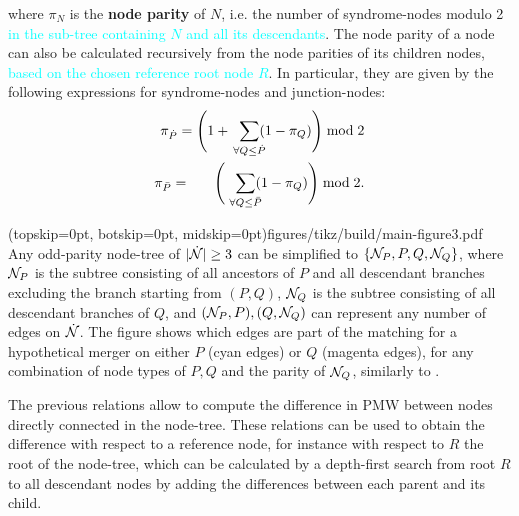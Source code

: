 where $\pi_N$ is the \textbf{node parity} of $N$, i.e. the number of syndrome-nodes modulo 2 \textcolor{cyan}{in the sub-tree containing $N$ and all its descendants}. The node parity of a node can also be calculated recursively from the node parities of its children nodes, \textcolor{cyan}{based on the chosen reference root node $R$}. In particular, they are given by the following expressions for syndrome-nodes and junction-nodes: 
\begin{align}
    \pi_{\dot{P}} = \Bigg(1 + \hspace{.2cm} \sum_{\mathclap{\forall Q \leq \dot{P}}} (1-\pi_Q) \Bigg ) \bmod 2 \label{eq:snodeparity} \\
    \pi_{\bar{P}} = \hspace{.6cm} \Bigg(\hspace{.2cm} \sum_{\mathclap{\forall Q \leq \bar{P}}} (1-\pi_Q) \Bigg) \bmod 2.  \label{eq:jnodeparity}
\end{align}

\Figure[tb](topskip=0pt, botskip=0pt, midskip=0pt){figures/tikz/build/main-figure3.pdf}{
  Any odd-parity node-tree of $\lvert\dot{\mathcal{N}}\rvert\geq 3$ can be simplified to $\{\mathcal{N}_P,P,Q,\mathcal{N}_Q\}$, where $\mathcal{N}_P$ is the subtree consisting of all ancestors of $P$ and all descendant branches excluding the branch starting from $(P,Q)$, $\mathcal{N}_Q$ is the subtree consisting of all descendant branches of $Q$, and $(\mathcal{N}_P, P), (Q, \mathcal{N}_Q)$ can represent any number of edges on $\dot{\mathcal{N}}$. The figure shows which edges are part of the matching for a hypothetical merger on either $P$ (cyan edges) or $Q$ (magenta edges), for any combination of node types of $P,Q$ and the parity of $\mathcal{N}_Q$, similarly to .
  \label{fig:nmcombi}}

The previous relations allow to compute the difference in PMW between nodes directly connected in the node-tree. These relations can be used to obtain the difference with respect to a reference node, for instance with respect to $R$ the root of the node-tree, which can be calculated by a depth-first search from root $R$ to all descendant nodes by adding the differences between each parent and its child. 




